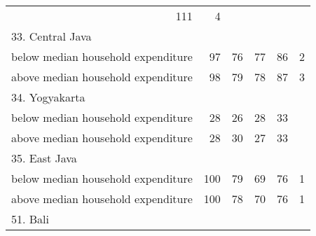 \begin{table}[!h]
\begin{tabular}{llllll}
  \multicolumn{1}{r}{111} &
  \multicolumn{1}{r}{4} \\
\multicolumn{1}{l}{33. Central Java} &
  \multicolumn{1}{|r}{} &
  \multicolumn{1}{r}{} &
  \multicolumn{1}{r}{} &
  \multicolumn{1}{r}{} &
  \multicolumn{1}{r}{} \\
\multicolumn{1}{l}{\hspace{1em}below median household expenditure} &
  \multicolumn{1}{|r}{97} &
  \multicolumn{1}{r}{76} &
  \multicolumn{1}{r}{77} &
  \multicolumn{1}{r}{86} &
  \multicolumn{1}{r}{2} \\
\multicolumn{1}{l}{\hspace{1em}above median household expenditure} &
  \multicolumn{1}{|r}{98} &
  \multicolumn{1}{r}{79} &
  \multicolumn{1}{r}{78} &
  \multicolumn{1}{r}{87} &
  \multicolumn{1}{r}{3} \\
\multicolumn{1}{l}{34. Yogyakarta} &
  \multicolumn{1}{|r}{} &
  \multicolumn{1}{r}{} &
  \multicolumn{1}{r}{} &
  \multicolumn{1}{r}{} &
  \multicolumn{1}{r}{} \\
\multicolumn{1}{l}{\hspace{1em}below median household expenditure} &
  \multicolumn{1}{|r}{28} &
  \multicolumn{1}{r}{26} &
  \multicolumn{1}{r}{28} &
  \multicolumn{1}{r}{33} &
  \multicolumn{1}{r}{} \\
\multicolumn{1}{l}{\hspace{1em}above median household expenditure} &
  \multicolumn{1}{|r}{28} &
  \multicolumn{1}{r}{30} &
  \multicolumn{1}{r}{27} &
  \multicolumn{1}{r}{33} &
  \multicolumn{1}{r}{} \\
\multicolumn{1}{l}{35. East Java} &
  \multicolumn{1}{|r}{} &
  \multicolumn{1}{r}{} &
  \multicolumn{1}{r}{} &
  \multicolumn{1}{r}{} &
  \multicolumn{1}{r}{} \\
\multicolumn{1}{l}{\hspace{1em}below median household expenditure} &
  \multicolumn{1}{|r}{100} &
  \multicolumn{1}{r}{79} &
  \multicolumn{1}{r}{69} &
  \multicolumn{1}{r}{76} &
  \multicolumn{1}{r}{1} \\
\multicolumn{1}{l}{\hspace{1em}above median household expenditure} &
  \multicolumn{1}{|r}{100} &
  \multicolumn{1}{r}{78} &
  \multicolumn{1}{r}{70} &
  \multicolumn{1}{r}{76} &
  \multicolumn{1}{r}{1} \\
\multicolumn{1}{l}{51. Bali} &
  \multicolumn{1}{|r}{} &
  \multicolumn{1}{r}{} &
  \multicolumn{1}{r}{} &
  \multicolumn{1}{r}{} &
  \multicolumn{1}{r}{} \\

\end{tabular}
\end{table}
